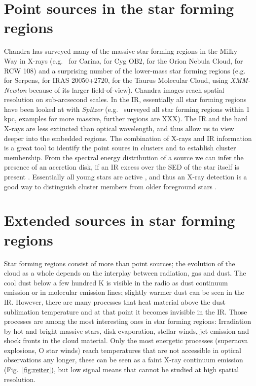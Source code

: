 \documentclass[12pt]{article}
\begin{document}
\section{Point sources in the star forming regions}
Chandra has surveyed many of the massive star forming regions in the Milky Way
in X-rays (e.g.\ \citealt{2011ApJS..194....1T} for Carina,
\citealt{2010ApJ...713..871W} for Cyg OB2, \citealt{2005ApJS..160..379F} for
the Orion Nebula Cloud, \citealt{2008AJ....135..693W} for RCW 108) and a
surprising number of the lower-mass star forming regions
(e.g.\ \citealt{2018AJ....155..241W} for Serpens, \citealt{2012AJ....144..101G}
for IRAS 20050+2720, \citealt{2007A&A...468..353G} for the Taurus Molecular
Cloud, using \emph{XMM-Newton} because of its larger field-of-view). Chandra
images reach spatial resolution on sub-arcsecond scales. In the IR, essentially
all star forming regions have been looked at with \emph{Spitzer}
(e.g.\ \citealt{2009ApJS..184...18G} surveyed all star forming regions within 1
kpc, examples for more massive, further regions are XXX). The IR and the hard
X-rays are less extincted than optical wavelength, and thus allow us to view
deeper into the embedded regions. The combination of X-rays and IR information
is a great tool to identify the point soures in clusters and to establish
cluster membership. From the spectral energy distribution of a source we can
infer the presence of an accretion disk, if an IR excess over the SED of the
star itself is present \citep{2009ApJS..184...18G}. Essentially all young stars
are active \citep{2018ApJS..235...43T}, and thus an X-ray detection is a good
way to distinguish cluster members from older
foreground stars \citep{2013ApJS..209...32B}. 

\section{Extended sources in star forming regions}
Star forming regions consist of more than point sources; the evolution of the
cloud as a whole depends on the interplay between radiation, gas and dust. The
cool dust below a few hundred K is visible in the radio as dust continuum
emission or in molecular emission lines; slightly warmer dust can be seen in
the IR. However, there are many processes that heat material above the dust
sublimation temperature and at that point it becomes invisible in the IR. Those
processes are among the most interesting ones in star forming regions:
Irradiation by hot and bright massive stars, disk evaporation, stellar winds,
jet emission and shock fronts in the cloud material. Only the most energetic
processes (supernova explosions, O star winds) reach temperatures that are not
accessible in optical observations any longer, these can be seen as a faint
X-ray continuum emission (Fig.~\ref{fig:reiter}), but low signal means that
cannot be studied at high spatial resolution.
\end{document}
